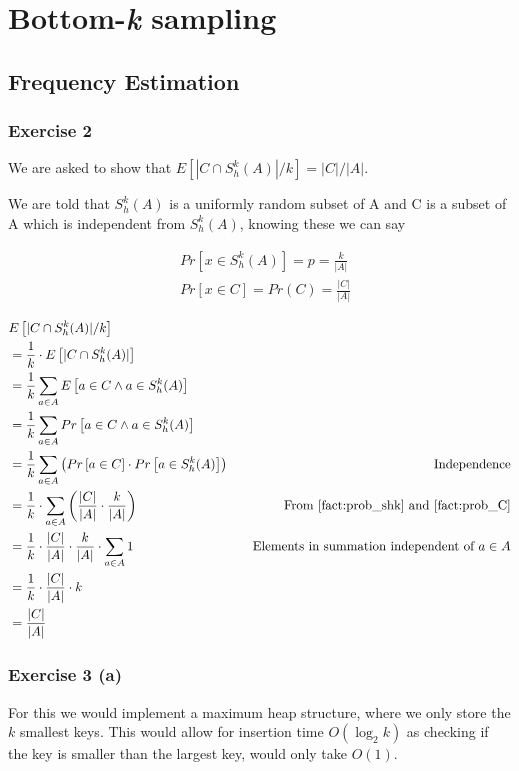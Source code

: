 \section{Bottom-\textit{k} sampling}
\subsection{Frequency Estimation}
\subsubsection{Exercise 2}

We are asked to show that \(E\left[ | C \cap S_h^k(A)| / k\right]  = |C|/|A|\). 

We are told that \(S_h^k(A)\) is a uniformly random subset of A and C is a subset of A which is independent from \(S_h^k(A)\), knowing these we can say 

\begin{align}
&Pr\left[x \in S_h^k(A)\right] = p = \frac{k}{|A|}  \label{fact:prob_shk}\\
&Pr\left[x \in C \right] = Pr(C) = \frac{|C|}{|A|}  \label{fact:prob_C}
\end{align}


\begin{align*}
  & {E}\left[ | C \cap S_h^k(A) | / k \right] & \\
  &= \frac{1}{k} \cdot {E}\left[ | C \cap S_h^k(A) |\right] & \\
  &= \frac{1}{k} \sum_{a\in A} {E}\left[ a \in C \land a \in S_h^k(A) \right] & \\
  &= \frac{1}{k}\sum_{a\in A} Pr\left[ a \in C \land a \in S_h^k(A) \right] & \\
  &= \frac{1}{k}\sum_{a\in A} \left( Pr\left[ a \in C \right] \cdot Pr\left[ a \in S_h^k(A) \right] \right) 
  & \quad \text{Independence} \\
  &= \frac{1}{k} \cdot \sum_{a\in A} \left( \frac{|C|}{|A|} \cdot \frac{k}{|A|} \right) & \quad \text{From \ref{fact:prob_shk} and \ref{fact:prob_C}} \\
  &= \frac{1}{k} \cdot \frac{|C|}{|A|} \cdot \frac{k}{|A|} \cdot \sum_{a\in A} 1 
  & \quad \text{Elements in summation independent of \(a \in A\)} \\
  &= \frac{1}{k} \cdot \frac{|C|}{|A|} \cdot k & \\
  &= \frac{|C|}{|A|} & 
\end{align*}

\subsubsection{Exercise 3 (a)}
For this we would implement a maximum heap structure, where we only store the \(k\) smallest keys. This would allow for insertion time \(O(\log_2 k)\) as checking if the key is smaller than the largest key, would only take \(O(1)\).
